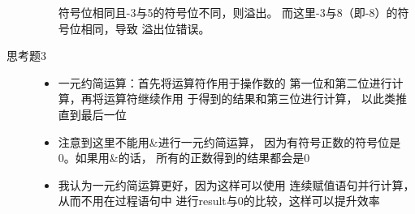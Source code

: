 \documentclass[12pt,a4paper,UTF8]{article}
\begin{document}
\begin{description}
\begin{itemize}
                符号位相同且-3与5的符号位不同，则溢出。
                而这里-3与8（即-8）的符号位相同，导致
                溢出位错误。
        \end{itemize}
  \item[思考题3] \hspace*{\fill}
        \begin{itemize}
          \item 一元约简运算：首先将运算符作用于操作数的
                第一位和第二位进行计算，再将运算符继续作用
                于得到的结果和第三位进行计算，
                以此类推直到最后一位
          \item 注意到这里不能用\&进行一元约简运算，
                因为有符号正数的符号位是0。如果用\&的话，
                所有的正数得到的结果都会是0
          \item 我认为一元约简运算更好，因为这样可以使用
                连续赋值语句并行计算，从而不用在过程语句中
                进行result与0的比较，这样可以提升效率
        \end{itemize}
\end{description}
\end{document}
